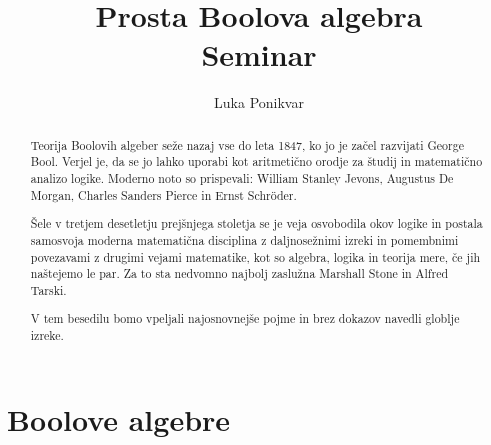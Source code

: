 \documentclass{amsart}
\title[Prosta Boolova algebra]{Prosta Boolova algebra\\\Large Seminar}
\author{Luka Ponikvar}
\begin{document}
\maketitle


\begin{abstract}
    Teorija Boolovih algeber seže nazaj vse do leta 1847, ko jo je začel 
    razvijati George Bool. Verjel je, da se jo lahko uporabi kot aritmetično 
    orodje za študij in matematično analizo logike. Moderno noto so prispevali:
    William Stanley Jevons, Augustus De Morgan, Charles Sanders Pierce in 
    Ernst Schr\"{o}der.

    Šele v tretjem desetletju prejšnjega stoletja se je veja osvobodila okov logike in postala samosvoja moderna 
    matematična disciplina z daljnosežnimi izreki in pomembnimi povezavami z drugimi 
    vejami matematike, kot so algebra, logika in teorija mere, če jih naštejemo le 
    par. Za to sta nedvomno najbolj zaslužna Marshall Stone in Alfred Tarski.

    V tem besedilu bomo vpeljali najosnovnejše pojme in brez dokazov 
    navedli globlje izreke.
\end{abstract}


\section{Boolove algebre}
\end{document}
